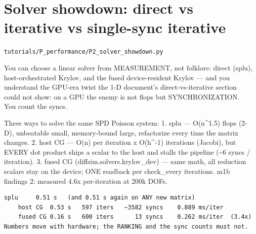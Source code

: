\chapter{Solver showdown: direct vs iterative vs single-sync iterative}
\label{ch:P2_solver_showdown}
\noindent\texttt{tutorials/P\_performance/P2\_solver\_showdown.py}\\[0.75em]
\begin{outcome}
You can choose a linear solver from MEASUREMENT, not
folklore: direct (splu), host-orchestrated Krylov, and the fused
device-resident Krylov — and you understand the GPU-era twist the 1-D
document's direct-vs-iterative section could not show: on a GPU the enemy
is not flops but SYNCHRONIZATION. You count the syncs.
\end{outcome}

Three ways to solve the same SPD Poisson system:
  1. splu           — O(n\textasciicircum{}1.5) flops (2-D), unbeatable small, memory-bound
                      large, refactorize every time the matrix changes.
  2. host CG        — O(n) per iteration x O(h\textasciicircum{}-1) iterations (Jacobi),
                      but EVERY dot product ships a scalar to the host and
                      stalls the pipeline (\textasciitilde{}6 syncs / iteration).
  3. fused CG (diffsim.solvers.krylov\_dev) — same math, all reduction
                      scalars stay on the device; ONE readback per
                      check\_every iterations. m1b findings 2: measured
                      4.6x per-iteration at 200k DOFs.

\begin{expected}
\begin{verbatim}
splu     0.51 s   (and 0.51 s again on ANY new matrix)
    host CG  0.53 s   597 iters   ~3582 syncs    0.889 ms/iter
    fused CG 0.16 s   600 iters      13 syncs    0.262 ms/iter  (3.4x)
Numbers move with hardware; the RANKING and the sync counts must not.
\end{verbatim}
\end{expected}

